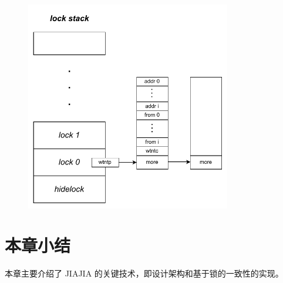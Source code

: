 {    \begin{figure}[!htbp]
        \centering
        \includegraphics[width=0.80\textwidth]{Img/JIAJIA锁栈结构.drawio.pdf}
        \label{fig:JIAJIA-lockstack}
    \end{figure}

    

    \section{本章小结}

    本章主要介绍了 JIAJIA 的关键技术，即设计架构和基于锁的一致性的实现。
}